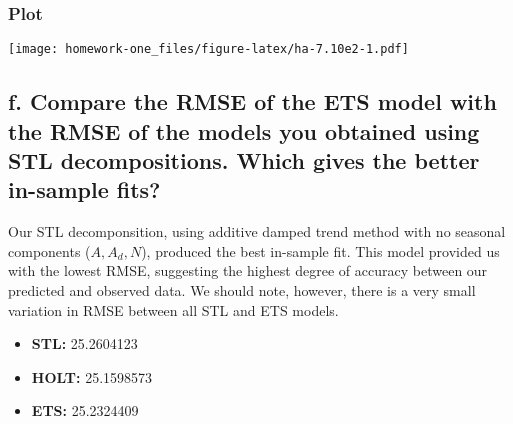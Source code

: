 \documentclass[openany]{book}
\newenvironment{Shaded}{\begin{snugshade}}{\end{snugshade}}
\newcommand{\DataTypeTok}[1]{\textcolor[rgb]{0.13,0.29,0.53}{#1}}
\newcommand{\FloatTok}[1]{\textcolor[rgb]{0.00,0.00,0.81}{#1}}
\newcommand{\KeywordTok}[1]{\textcolor[rgb]{0.13,0.29,0.53}{\textbf{#1}}}
\newcommand{\NormalTok}[1]{#1}
\newcommand{\OperatorTok}[1]{\textcolor[rgb]{0.81,0.36,0.00}{\textbf{#1}}}
\newcommand{\StringTok}[1]{\textcolor[rgb]{0.31,0.60,0.02}{#1}}
\providecommand{\tightlist}{%
  \setlength{\itemsep}{0pt}\setlength{\parskip}{0pt}}
\begin{document}
\hypertarget{plot-3}{%
\subsubsection{Plot}\label{plot-3}}

\begin{Shaded}
\end{Shaded}

\texttt{[image: homework-one\_files/figure-latex/ha-7.10e2-1.pdf]}

\hypertarget{f.-compare-the-rmse-of-the-ets-model-with-the-rmse-of-the-models-you-obtained-using-stl-decompositions.-which-gives-the-better-in-sample-fits}{%
\subsection{f. Compare the RMSE of the ETS model with the RMSE of the models you obtained using STL decompositions. Which gives the better in-sample fits?}\label{f.-compare-the-rmse-of-the-ets-model-with-the-rmse-of-the-models-you-obtained-using-stl-decompositions.-which-gives-the-better-in-sample-fits}}

Our STL decomponsition, using additive damped trend method with no seasonal components (\(A, A_d, N\)), produced the best in-sample fit. This model provided us with the lowest RMSE, suggesting the highest degree of accuracy between our predicted and observed data. We should note, however, there is a very small variation in RMSE between all STL and ETS models.

\begin{itemize}
\tightlist
\item
  \textbf{STL:} 25.2604123
\item
  \textbf{HOLT:} 25.1598573
\item
  \textbf{ETS:} 25.2324409
\end{itemize}
\end{document}
